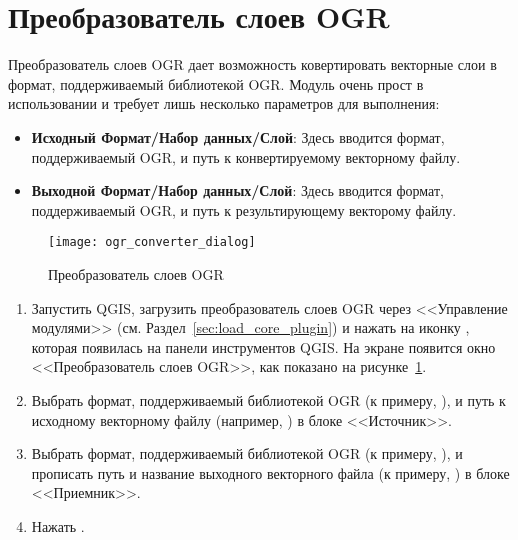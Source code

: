 
\section{Преобразователь слоев OGR}


Преобразователь слоев OGR дает возможность ковертировать векторные слои
в формат, поддерживаемый библиотекой OGR.  Модуль очень прост в использовании и требует лишь несколько
параметров для выполнения:

\begin{itemize}[label=--]
\item \textbf{Исходный Формат/Набор данных/Слой}: Здесь вводится
формат, поддерживаемый OGR, и путь к конвертируемому векторному файлу.
\item \textbf{Выходной Формат/Набор данных/Слой}: Здесь вводится
формат, поддерживаемый OGR, и путь к результирующему векторому файлу.
\end{itemize}

\begin{figure}[ht]
 \centering
   \texttt{[image: ogr\_converter\_dialog]}
   \caption{Преобразователь слоев OGR \nixcaption}\label{fig:ogr_converter_dialog}
\end{figure}


\begin{enumerate}
  \item Запустить QGIS, загрузить преобразователь слоев OGR через
  <<Управление модулями>> (см. Раздел~\ref{sec:load_core_plugin}) и
  нажать на иконку ,
  которая появилась на панели инструментов QGIS. На экране появится окно
  <<Преобразователь слоев OGR>>, как показано на рисунке~\ref{fig:ogr_converter_dialog}.
  \item Выбрать формат, поддерживаемый библиотекой OGR (к примеру,
  ), и путь к исходному
  векторному файлу (например, ) в блоке <<Источник>>.
  \item Выбрать формат, поддерживаемый библиотекой OGR (к примеру,
  ), и прописать путь и название выходного
  векторного файла (к примеру, ) в блоке <<Приемник>>.
  \item Нажать .
\end{enumerate}

\FloatBarrier
